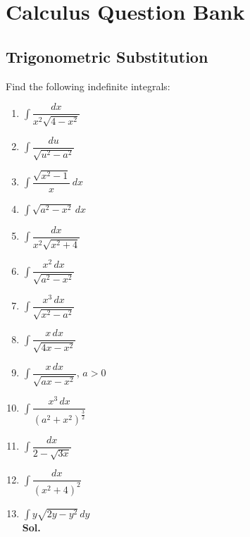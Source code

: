\documentclass{report}
\newcommand{\sol}{\vspace{1em}\\\textbf{Sol.}}
\begin{document}
\section*{Calculus Question Bank}
\subsection*{Trigonometric Substitution}

Find the following indefinite integrals:
\begin{enumerate}
    \item $\displaystyle\int\dfrac{dx}{x^2\sqrt{4-x^2}}$
    \item $\displaystyle\int\dfrac{du}{\sqrt{u^2 - a^2}}$
    \item $\displaystyle\int\dfrac{\sqrt{x^2 - 1}}{x}\,dx$
    \item $\displaystyle\int\sqrt{a^2 - x^2}\,dx$
    \item $\displaystyle\int\dfrac{dx}{x^2\sqrt{x^2 + 4}}$
    \item $\displaystyle\int\dfrac{x^2\,dx}{\sqrt{a^2 - x^2}}$
    \item $\displaystyle\int\dfrac{x^3\,dx}{\sqrt{x^2 - a^2}}$
    \item $\displaystyle\int\dfrac{x\,dx}{\sqrt{4x - x^2}}$
    \item $\displaystyle\int\dfrac{x\,dx}{\sqrt{ax - x^2}}$, $a > 0$
    \item $\displaystyle\int\dfrac{x^3\,dx}{(a^2 + x^2)^{\frac{3}{2}}}$
    \item $\displaystyle\int\dfrac{dx}{2 - \sqrt{3x}}$
    \item $\displaystyle\int\dfrac{dx}{(x^2+4)^2}$
    \item $\displaystyle\int y\sqrt{2y - y^2}\,dy$
          \sol{}


\end{enumerate}
\end{document}
